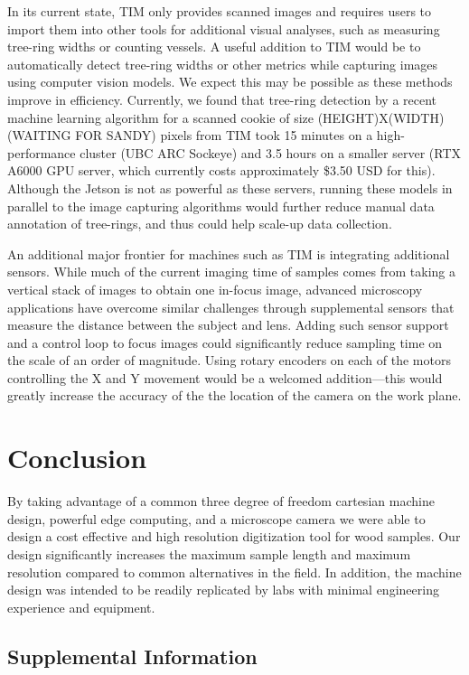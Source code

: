 \documentclass[a4paper,12pt]{article}
\begin{document}
In its current state, TIM only provides scanned images and requires users to import them into other tools for additional visual analyses, such as measuring tree-ring widths or counting vessels.
A useful addition to TIM would be to automatically detect tree-ring widths or other metrics while capturing images using computer vision models. We expect this may be possible as these methods improve in efficiency. Currently, we found that tree-ring detection by a recent machine learning algorithm  \citeauthor[R-CNN presented by][]{polacek_automation_2023} for a scanned cookie of size (HEIGHT)X(WIDTH) (WAITING FOR SANDY) pixels from TIM  took 15 minutes on a high-performance cluster (UBC ARC Sockeye) and 3.5 hours on a smaller server (RTX A6000 GPU server, which currently costs approximately \$3.50 USD for this). 
Although the Jetson is not as powerful as these servers, running these models in parallel to the image capturing algorithms would further reduce manual data annotation of tree-rings, and thus could help scale-up data collection.

An additional major frontier for machines such as TIM is integrating additional sensors. While much of the current imaging time of samples comes from taking a vertical stack of images to obtain one in-focus image, advanced microscopy applications have overcome similar challenges through supplemental sensors that measure the distance between the subject and lens.
Adding such sensor support and a control loop to focus images could significantly reduce sampling time on the scale of an order of magnitude. 
Using rotary encoders on each of the motors controlling the X and Y movement would be a welcomed addition---this would greatly increase the 
accuracy of the the location of the camera on the work plane.  

\section{Conclusion} %
By taking advantage of a common three degree of freedom cartesian machine design, powerful edge computing, and a microscope camera we were able to design a cost effective and high resolution digitization tool for wood samples. 
Our design significantly increases the maximum sample length and maximum resolution compared to common alternatives in the field. 
In addition, the machine design was intended to be readily replicated by labs with minimal engineering experience and equipment. 


\subsection{Supplemental Information}
\renewcommand{\thetable}{S\arabic{table}}




\end{document}
